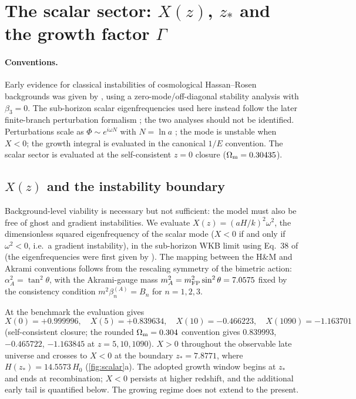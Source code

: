 \section{The scalar sector: \texorpdfstring{$X(z)$, $z_*$}{X(z), z*} and the growth factor \texorpdfstring{$\Gamma$}{Gamma}}\label{sec:scalar}

\paragraph{Conventions.}
Early evidence for classical instabilities of cosmological Hassan--Rosen backgrounds was given by \citet{Kuhnel2013}, using a zero-mode/off-diagonal stability analysis with $\beta_3=0$. The sub-horizon scalar eigenfrequencies used here instead follow the later finite-branch perturbation formalism \citep{Konnig2014,Akrami2015}; the two analyses should not be identified. Perturbations scale as $\Phi\sim e^{i\omega N}$ with $N=\ln a$ \citep[][Eq.~37]{Akrami2015}; the mode is unstable when $X<0$; the growth integral is evaluated in the canonical $1/E$ convention. The scalar sector is evaluated at the self-consistent $z=0$ closure ($\Omega_{\mathrm m}=0.30435$).

\subsection{\texorpdfstring{$X(z)$}{X(z)} and the instability boundary}\label{sec:Xz}
Background-level viability is necessary but not sufficient: the model must also be free of ghost and gradient instabilities. We evaluate $X(z)=(aH/k)^2\omega^2$, the dimensionless squared eigenfrequency of the scalar mode ($X<0$ if and only if $\omega^2<0$, i.e.\ a gradient instability), in the sub-horizon WKB limit using Eq.~38 of \citet{Akrami2015} (the eigenfrequencies were first given by \citealp{Konnig2014}). The mapping between the H\&M and Akrami conventions follows from the rescaling symmetry of the bimetric action: $\alpha_A^2=\tan^2\theta$, with the Akrami-gauge mass $m_A^2=m_{\mathrm{FP}}^2\sin^2\theta=7.0575$ fixed by the consistency condition $m^2\beta_n^{(A)}=B_n$ for $n=1,2,3$.

At the benchmark the evaluation gives
\begin{equation}
X(0)=+0.999996,\quad X(5)=+0.839634,\quad X(10)=-0.466223,\quad X(1090)=-1.163701
\end{equation}
(self-consistent closure; the rounded $\Omega_{\mathrm m}=0.304$ convention gives $0.839993$, $-0.465722$, $-1.163845$ at $z=5,10,1090$). $X>0$ throughout the observable late universe and crosses to $X<0$ at the boundary $z_*=7.8771$, where $H(z_*)=14.5573\,H_0$ (\cref{fig:scalar}a). The adopted growth window begins at $z_*$ and ends at recombination; $X<0$ persists at higher redshift, and the additional early tail is quantified below. The growing regime does not extend to the present.

